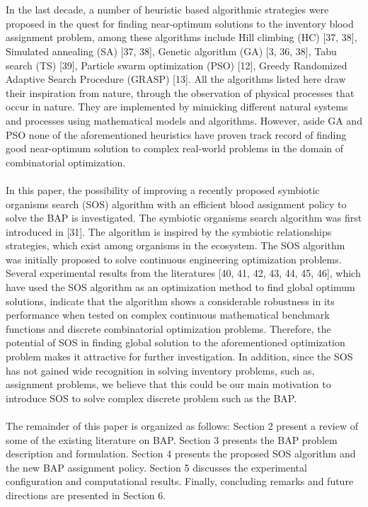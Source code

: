 \documentclass{article}
\begin{document}
\\
\\
In the last decade, a number of heuristic based algorithmic strategies were proposed in the quest for finding near-optimum solutions to the inventory blood assignment problem, among these algorithms include Hill climbing (HC) [37, 38], Simulated annealing (SA) [37, 38], Genetic algorithm (GA) [3, 36, 38], Tabu search (TS) [39], Particle swarm optimization (PSO) [12], Greedy Randomized Adaptive Search Procedure (GRASP) [13]. All the algorithms listed here draw their inspiration from nature, through the observation of physical processes that occur in nature. They are implemented by mimicking different natural systems and processes using mathematical models and algorithms. However, aside GA and PSO none of the aforementioned heuristics have proven track record of finding good near-optimum solution to complex real-world problems in the domain of combinatorial optimization.
\\
\\
In this paper, the possibility of improving a recently proposed symbiotic organisms search (SOS) algorithm with an efficient blood assignment policy to solve the BAP is investigated. The symbiotic organisms search algorithm was first introduced in [31]. The algorithm is inspired by the symbiotic relationships strategies, which exist among organisms in the ecosystem. The SOS algorithm was initially proposed to solve continuous engineering optimization problems. Several experimental results from the literatures [40, 41, 42, 43, 44, 45, 46], which have used the SOS algorithm as an optimization method to find global optimum solutions, indicate that the algorithm shows a considerable robustness in its performance when tested on complex continuous mathematical benchmark functions and discrete combinatorial optimization problems. Therefore, the potential of SOS in finding global solution to the aforementioned optimization problem makes it attractive for further investigation. In addition, since the SOS has not gained wide recognition in solving inventory problems, such as, assignment problems, we believe that this could be our main motivation to introduce SOS to solve complex discrete problem such as the BAP.
\\
\\
The remainder of this paper is organized as follows: Section 2 present a review of some of the existing literature on BAP. Section 3 presents the BAP problem description and formulation. Section 4 presents the proposed SOS algorithm and the new BAP assignment policy. Section 5 discusses the experimental configuration and computational results. Finally, concluding remarks and future directions are presented in Section 6.
\end{document}
